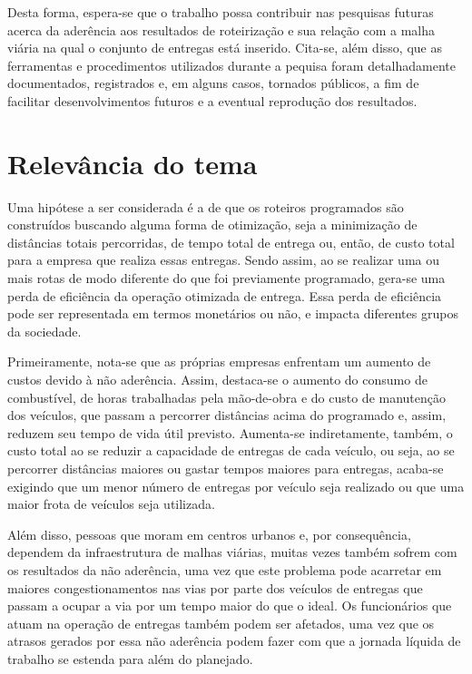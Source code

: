 Desta forma, espera-se que o trabalho possa contribuir nas pesquisas futuras acerca da aderência aos resultados de roteirização e sua relação com a malha viária na qual o conjunto de entregas está inserido.
Cita-se, além disso, que as ferramentas e procedimentos utilizados durante a pequisa foram detalhadamente documentados, registrados e, em alguns casos, tornados públicos, a fim de facilitar desenvolvimentos futuros e a eventual reprodução dos resultados.

\section{Relevância do tema} \label{RelevanciaTema}

Uma hipótese a ser considerada é a de que os roteiros programados são construídos buscando alguma forma de otimização, seja a minimização de distâncias totais percorridas, de tempo total de entrega ou, então, de custo total para a empresa que realiza essas entregas. 
Sendo assim, ao se realizar uma ou mais rotas de modo diferente do que foi previamente programado, gera-se uma perda de eficiência da operação otimizada de entrega.
Essa perda de eficiência pode ser representada em termos monetários ou não, e impacta diferentes grupos da sociedade.

Primeiramente, nota-se que as próprias empresas enfrentam um aumento de custos devido à não aderência.
Assim, destaca-se o aumento do consumo de combustível, de horas trabalhadas pela mão-de-obra e do custo de manutenção dos veículos, que passam a percorrer distâncias acima do programado e, assim, reduzem seu tempo de vida útil previsto.
Aumenta-se indiretamente, também, o custo total ao se reduzir a capacidade de entregas de cada veículo, ou seja, ao se percorrer distâncias maiores ou gastar tempos maiores para entregas, acaba-se exigindo que um menor número de entregas por veículo seja realizado ou que uma maior frota de veículos seja utilizada.

Além disso, pessoas que moram em centros urbanos e, por consequência, dependem da infraestrutura de malhas viárias, muitas vezes também sofrem com os resultados da não aderência, uma vez que este problema pode acarretar em maiores congestionamentos nas vias por parte dos veículos de entregas que passam a ocupar a via por um tempo maior do que o ideal.
Os funcionários que atuam na operação de entregas também podem ser afetados, uma vez que os atrasos gerados por essa não aderência podem fazer com que a jornada líquida de trabalho se estenda para além do planejado.

